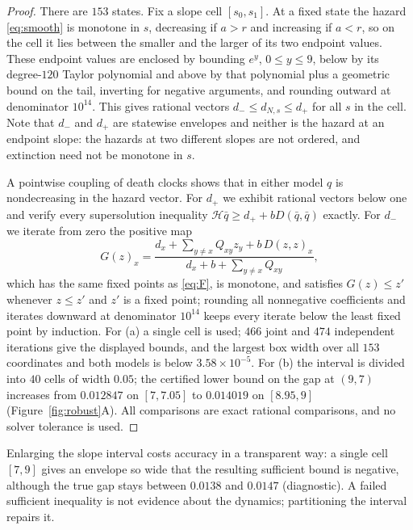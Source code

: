 \documentclass[11pt]{article}
\theoremstyle{remark}
\newcommand{\Hm}{\mathcal H}
\begin{document}
\begin{proof}
There are $153$ states. Fix a slope cell $[s_0,s_1]$. At a fixed state the
hazard \eqref{eq:smooth} is monotone in $s$, decreasing if $a>r$ and
increasing if $a<r$, so on the cell it lies between the smaller and the
larger of its two endpoint values. These endpoint values are enclosed by
bounding $e^y$, $0\le y\le9$, below by its degree-$120$ Taylor polynomial and
above by that polynomial plus a geometric bound on the tail, inverting for
negative arguments, and rounding outward at denominator $10^{14}$. This gives
rational vectors $d_-\le d_{N,s}\le d_+$ for all $s$ in the cell. Note that
$d_-$ and $d_+$ are statewise envelopes and neither is the hazard at an
endpoint slope: the hazards at two different slopes are not ordered, and
extinction need not be monotone in $s$.

A pointwise coupling of death clocks shows that in either model $q$ is
nondecreasing in the hazard vector. For $d_+$ we exhibit rational vectors
below one and verify every supersolution inequality
$\Hm\bar q\ge d_++bD(\bar q,\bar q)$ exactly. For $d_-$ we iterate from zero
the positive map
\begin{equation}\label{eq:G}
 G(z)_x=\frac{d_x+\sum_{y\ne x}Q_{xy}z_y+b\,D(z,z)_x}{d_x+b+\sum_{y\ne x}Q_{xy}},
\end{equation}
which has the same fixed points as \eqref{eq:F}, is monotone, and satisfies
$G(z)\le z'$ whenever $z\le z'$ and $z'$ is a fixed point; rounding all
nonnegative coefficients and iterates downward at denominator $10^{14}$ keeps
every iterate below the least fixed point by induction. For (a) a single
cell is used; $466$ joint and $474$ independent iterations give the displayed
bounds, and the largest box width over all $153$ coordinates and both models
is below $3.58\times10^{-5}$. For (b) the interval is divided into $40$ cells
of width $0.05$; the certified lower bound on the gap at $(9,7)$ increases
from $0.012847$ on $[7,7.05]$ to $0.014019$ on $[8.95,9]$
(Figure~\ref{fig:robust}A). All comparisons are exact rational comparisons,
and no solver tolerance is used.
\end{proof}

Enlarging the slope interval costs accuracy in a transparent way: a single
cell $[7,9]$ gives an envelope so wide that the resulting sufficient bound is
negative, although the true gap stays between $0.0138$ and $0.0147$
(diagnostic). A failed sufficient inequality is not evidence about the
dynamics; partitioning the interval repairs it.
\end{document}
